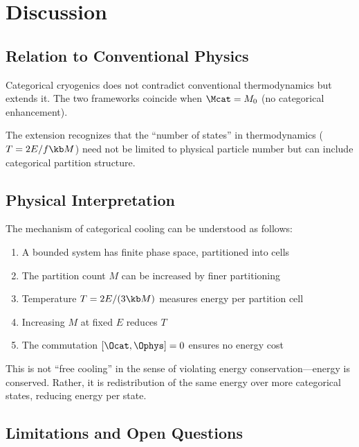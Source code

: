 \section{Discussion}

\subsection{Relation to Conventional Physics}

Categorical cryogenics does not contradict conventional thermodynamics but extends it. The two frameworks coincide when $\Mcat = M_0$ (no categorical enhancement).

The extension recognizes that the ``number of states'' in thermodynamics ($T = 2E/f\kb M$) need not be limited to physical particle number but can include categorical partition structure.

\subsection{Physical Interpretation}

The mechanism of categorical cooling can be understood as follows:

\begin{enumerate}
    \item A bounded system has finite phase space, partitioned into cells
    \item The partition count $M$ can be increased by finer partitioning
    \item Temperature $T = 2E/(3\kb M)$ measures energy per partition cell
    \item Increasing $M$ at fixed $E$ reduces $T$
    \item The commutation $[\Ocat, \Ophys] = 0$ ensures no energy cost
\end{enumerate}

This is not ``free cooling'' in the sense of violating energy conservation---energy is conserved. Rather, it is redistribution of the same energy over more categorical states, reducing energy per state.

\subsection{Limitations and Open Questions}

